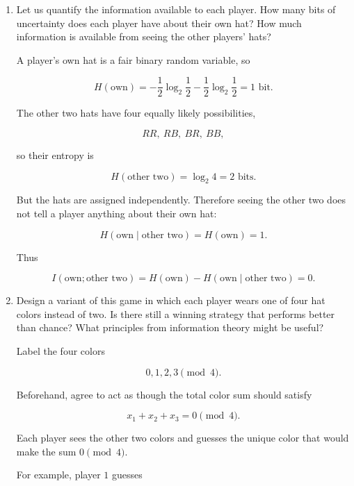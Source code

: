 \documentclass[11pt]{article}
\begin{document}
\begin{enumerate}
\[
W\leq 3L.
\]

Also

\[
W+L=8.
\]

Hence

\[
W\leq 3(8-W),
\]

so

\[
4W\leq 24
\]

and therefore

\[
W\leq 6.
\]

So the \(6/8=3/4\) strategy is optimal.

\item Let us quantify the information available to each player. How
many bits of uncertainty does each player have about their own hat?
How much information is available from seeing the other players' hats?

A player's own hat is a fair binary random variable, so

\[
H(\text{own})
=
-\frac12\log_2\frac12
-\frac12\log_2\frac12
=
1\text{ bit}.
\]

The other two hats have four equally likely possibilities,

\[
RR,\ RB,\ BR,\ BB,
\]

so their entropy is

\[
H(\text{other two})=\log_2 4=2\text{ bits}.
\]

But the hats are assigned independently. Therefore seeing the other two
does not tell a player anything about their own hat:

\[
H(\text{own}\mid\text{other two})
=
H(\text{own})
=
1.
\]

Thus

\[
I(\text{own};\text{other two})
=
H(\text{own})-H(\text{own}\mid\text{other two})
=
0.
\]

\item Design a variant of this game in which each player wears one of
four hat colors instead of two. Is there still a winning strategy that
performs better than chance? What principles from information theory
might be useful?

Label the four colors

\[
0,1,2,3\pmod 4.
\]

Beforehand, agree to act as though the total color sum should satisfy

\[
x_1+x_2+x_3=0\pmod 4.
\]

Each player sees the other two colors and guesses the unique color that
would make the sum \(0\pmod4\).

For example, player \(1\) guesses


\end{enumerate}
\end{document}

